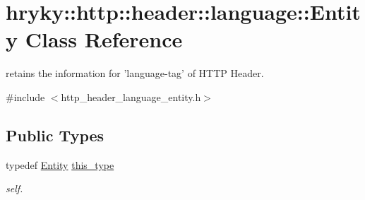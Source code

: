 \hypertarget{classhryky_1_1http_1_1header_1_1language_1_1_entity}{\section{hryky\-:\-:http\-:\-:header\-:\-:language\-:\-:Entity Class Reference}
\label{classhryky_1_1http_1_1header_1_1language_1_1_entity}
}


retains the information for 'language-\/tag' of H\-T\-T\-P Header.  




{\ttfamily \#include $<$http\-\_\-header\-\_\-language\-\_\-entity.\-h$>$}

\subsection*{Public Types}
\begin{DoxyCompactItemize}
\item 
\hypertarget{classhryky_1_1http_1_1header_1_1language_1_1_entity_a363e0d7f532da3d6d3b64751e6ecf72d}{typedef \hyperlink{classhryky_1_1http_1_1header_1_1language_1_1_entity}{Entity} \hyperlink{classhryky_1_1http_1_1header_1_1language_1_1_entity_a363e0d7f532da3d6d3b64751e6ecf72d}{this\-\_\-type}}\label{classhryky_1_1http_1_1header_1_1language_1_1_entity_a363e0d7f532da3d6d3b64751e6ecf72d}

\begin{DoxyCompactList}\small\item\em self. \end{DoxyCompactList}\end{DoxyCompactItemize}
